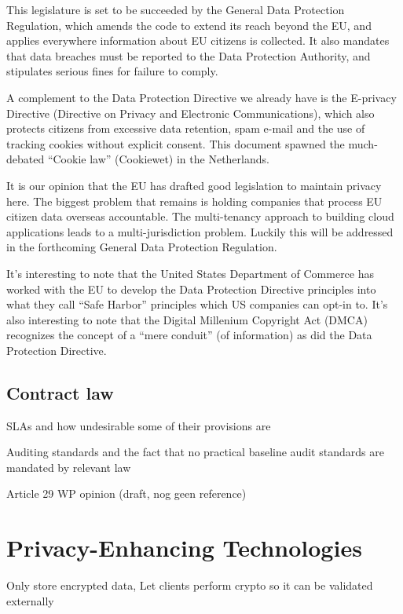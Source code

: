 \documentclass[11pt]{article}
\begin{document}
This legislature is set to be succeeded by the General Data Protection Regulation, which amends the code to extend its reach beyond the EU, and applies everywhere information about EU citizens is collected.
It also mandates that data breaches must be reported to the Data Protection Authority, and stipulates serious fines for failure to comply.

A complement to the Data Protection Directive we already have is the E-privacy Directive (Directive on Privacy and Electronic Communications), which also protects citizens from excessive data retention, spam e-mail and the use of tracking cookies without explicit consent.
This document spawned the much-debated ``Cookie law'' (Cookiewet) in the Netherlands.

It is our opinion that the EU has drafted good legislation to maintain privacy here.
The biggest problem that remains is holding companies that process EU citizen data overseas accountable.
The multi-tenancy approach to building cloud applications leads to a multi-jurisdiction problem.
Luckily this will be addressed in the forthcoming General Data Protection Regulation.

It's interesting to note that the United States Department of Commerce has worked with the EU to develop the Data Protection Directive principles into what they call ``Safe Harbor'' principles which US companies can opt-in to.
It's also interesting to note that the Digital Millenium Copyright Act (DMCA) recognizes the concept of a ``mere conduit'' (of information) as did the Data Protection Directive. \cite{congress1998digital}

\subsection{Contract law}
SLAs and how undesirable some of their provisions are

Auditing standards and the fact that no practical baseline audit standards are mandated by relevant law

Article 29 WP opinion (draft, nog geen reference)


\section{Privacy-Enhancing Technologies}
Only store encrypted data, Let clients perform crypto so it can be validated externally
\cite{kamara2010cryptographic}
\end{document}
